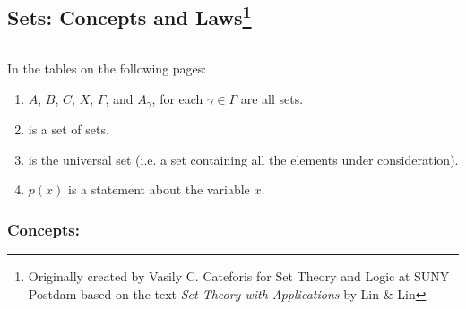 \subsection*{Sets: Concepts and Laws\footnote{Originally created by Vasily C. Cateforis for Set Theory and Logic at SUNY Postdam based on the text {\em Set Theory with Applications} by Lin \& Lin}
}

\noindent
\rule{\textwidth}{0.1pt}

\noindent
In the tables on the following pages:
\begin{enumerate}
	\item[(a)] $A$, $B$, $C$, $X$, $\Gamma$, and $A_\gamma$, for each $\gamma\in\Gamma$ are all sets.
	\item[(b)] \familySet is a set of sets.
	\item[(c)] \uniSet is the universal set (i.e. a set containing all the elements under consideration).
	\item[(d)] $p(x)$ is a statement about the variable $x$.
\end{enumerate}

\clearpage

\subsubsection*{Concepts:}

\setlength{\extrarowheight}{5pt}

